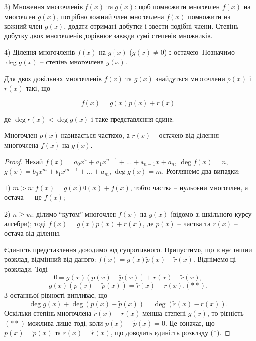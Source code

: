 3) Множення многочленів $f(x)$ та $g(x)$: щоб помножити многочлен $f(x)$ на
многочлен $g(x)$, потрібно кожний член многочлена $f(x)$ помножити на кожний
член $g(x)$, додати отримані добутки і звести подібні члени. Степінь добутку двох
многочленів дорівнює завжди сумі степенів множників.

4) Ділення многочленів $f(x)$ на $g(x)$ ($g(x) \neq 0$) з остачею. Позначимо
$\deg g(x)$ -- степінь многочлена $g(x)$.

\begin{theorem}
    Для двох довільних многочленів $f(x)$ та $g(x)$ знайдуться
    многочлени $p(x)$ і $r(x)$ такі, що
    
    $$f(x) = g(x)p(x) + r(x)$$
    
    де $\deg r(x) < \deg g(x)$ і таке представлення єдине.
    
    Многочлен $p(x)$ називається часткою, а $r(x)$ -- остачею від ділення
    многочлена $f(x)$ на $g(x)$.
\end{theorem}
\begin{proof}
    Нехай $f(x) = a_0x^n + a_1x^{n-1} + ... + a_{n-1}x + a_n$, $\deg f(x) = n$,
    $g(x) = b_0x^m + b_1x^{m-1} + ... + a_m$, $\deg g(x) = m$. Розглянемо два випадки:
    
    1) $m > n: f(x) = g(x) 0(x) + f(x)$, тобто частка -- нульовий многочлен, а остача
    --- це $f(x)$; 
    
    2) $n \geqslant m$: ділимо “кутом” многочлен $f(x)$ на $g(x)$ (відомо зі шкільного курсу
    алгебри); тоді $f(x) = g(x)p(x) + r(x)$, де $p(x)$ -- частка та $r(x)$ -- остача від
    ділення.
    
    Єдиність представлення доводимо від супротивного. Припустимо, що існує інший
    розклад, відмінний від даного: $f(x) = g(x)\tilde{p}(x) + \tilde{r}(x)$. Віднімемо ці розклади. Тоді
    \begin{equation*}
        0 = g(x)(p(x) -\tilde{p}(x)) + r(x) - \tilde{r}(x),
    \end{equation*}
    \begin{equation*}
        g(x)(p(x) -\tilde{p}(x)) = \tilde{r}(x) - r(x). (**).
    \end{equation*}
    З останньої рівності випливає, що
    \begin{equation*}
        \deg g(x) + \deg(p(x) -\tilde{p}(x)) = \deg(\tilde{r}(x) - r(x)).
    \end{equation*}
    Оскільки степінь многочлена $\tilde{r}(x) - r(x)$ менша степені $g(x)$, то рівність $(**)$
    можлива лише тоді, коли $p(x) -\tilde{p}(x) = 0$. Це означає, що $p(x) = \tilde{p}(x)$ та $r(x) = \tilde{r}(x)$,
    що доводить єдиність розкладу (*).
\end{proof}


